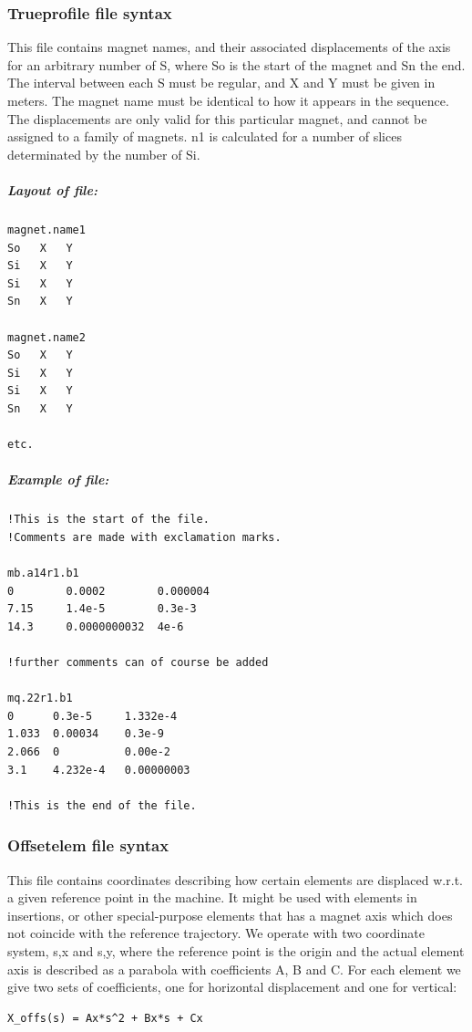 \subsubsection{Trueprofile file syntax}

 This file contains magnet names, and their associated displacements of the axis for  an arbitrary number of S, where So is the start of the magnet and Sn the end. The interval between each S must be regular, and X and Y  must be given in meters. The magnet name must be identical to how it appears in the  sequence. The displacements are only valid for this particular magnet, and cannot be  assigned to a family of magnets. n1 is calculated for a number of slices determinated by the number of Si.
\\

\subparagraph{Layout of file:}
\begin{verbatim}
magnet.name1
So   X   Y
Si   X   Y
Si   X   Y
Sn   X   Y

magnet.name2
So   X   Y
Si   X   Y
Si   X   Y
Sn   X   Y

etc.
\end{verbatim}

\subparagraph{Example of file:}
\begin{verbatim}
!This is the start of the file.
!Comments are made with exclamation marks.

mb.a14r1.b1
0        0.0002        0.000004
7.15     1.4e-5        0.3e-3
14.3     0.0000000032  4e-6

!further comments can of course be added

mq.22r1.b1
0      0.3e-5     1.332e-4
1.033  0.00034    0.3e-9
2.066  0          0.00e-2
3.1    4.232e-4   0.00000003

!This is the end of the file.
\end{verbatim}

\subsubsection{Offsetelem file syntax}

This file contains coordinates describing how certain elements are displaced w.r.t. a  given reference point in the machine. It might be used with elements in insertions, or other special-purpose elements that has a magnet axis which does not coincide with the reference trajectory. We operate with two coordinate system, s,x and s,y, where the reference point is the origin and the actual element axis is described as a parabola with coefficients A, B and C. For each element we give two sets of coefficients, one for horizontal displacement and one for vertical: 
\begin{verbatim}
X_offs(s) = Ax*s^2 + Bx*s + Cx 
\end{verbatim}

